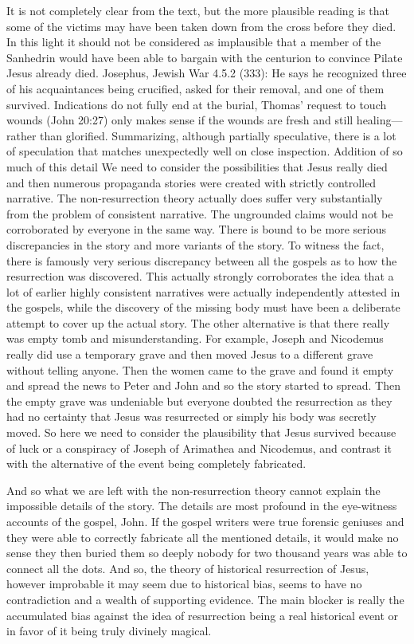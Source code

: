 It is not completely clear from the text, but the more plausible reading is that some of the victims may have been taken down from the cross before they died.
In this light it should not be considered as implausible that a member of the Sanhedrin would have been able to bargain with the centurion to convince Pilate Jesus already died.
Josephus, Jewish War 4.5.2 (333): He says he recognized three of his acquaintances being crucified, asked for their removal, and one of them survived.
Indications do not fully end at the burial, Thomas’ request to touch wounds (John 20:27) only makes sense if the wounds are fresh and still healing—rather than glorified.
Summarizing, although partially speculative, there is a lot of speculation that matches unexpectedly well on close inspection.
Addition of so much of this detail We need to consider the possibilities that Jesus really died and then numerous propaganda stories were created with strictly controlled narrative.
The non-resurrection theory actually does suffer very substantially from the problem of consistent narrative.
The ungrounded claims would not be corroborated by everyone in the same way.
There is bound to be more serious discrepancies in the story and more variants of the story.
To witness the fact, there is famously very serious discrepancy between all the gospels as to how the resurrection was discovered.
This actually strongly corroborates the idea that a lot of earlier highly consistent narratives were actually independently attested in the gospels, while the discovery of the missing body must have been a deliberate attempt to cover up the actual story.
The other alternative is that there really was empty tomb and misunderstanding.
For example, Joseph and Nicodemus really did use a temporary grave and then moved Jesus to a different grave without telling anyone.
Then the women came to the grave and found it empty and spread the news to Peter and John and so the story started to spread.
Then the empty grave was undeniable but everyone doubted the resurrection as they had no certainty that Jesus was resurrected or simply his body was secretly moved.
So here we need to consider the plausibility that Jesus survived because of luck or a conspiracy of Joseph of Arimathea and Nicodemus, and contrast it with the alternative of the event being completely fabricated.

And so what we are left with the non-resurrection theory cannot explain the impossible details of the story.
The details are most profound in the eye-witness accounts of the gospel, John.
If the gospel writers were true forensic geniuses and they were able to correctly fabricate all the mentioned details, it would make no sense they then buried them so deeply nobody for two thousand years was able to connect all the dots.
And so, the theory of historical resurrection of Jesus, however improbable it may seem due to historical bias, seems to have no contradiction and a wealth of supporting evidence.
The main blocker is really the accumulated bias against the idea of resurrection being a real historical event or in favor of it being truly divinely magical.

